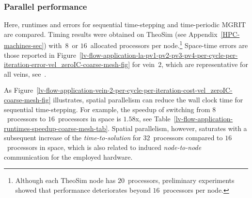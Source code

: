 \documentclass[3p]{elsarticle}
\begin{document}
\subsubsection{Parallel performance}
Here, runtimes and errors for sequential time-stepping and time-periodic MGRIT are compared.
Timing results were obtained on TheoSim (see Appendix~\ref{HPC-machines-sec})
with~$8$~or $16$~allocated processors per node.\footnote{Although each TheoSim node has $20$~processors,
preliminary experiments showed that performance deteriorates beyond $16$~processors per node.}
Space-time errors are those reported
in Figure~\ref{lv-flow-application-la-pv1-pv2-pv3-pv4-per-cycle-per-iteration-error-vel_zeroIC-coarse-mesh-fig}
for vein~$2$, which are representative for all veins, see~\cite{Hessenthaler2020_PhD}.

As Figure~\ref{lv-flow-application-vein-2-per-cycle-per-iteration-cost-vel_zeroIC-coarse-mesh-fig} illustrates,
spatial parallelism can reduce the wall clock time for sequential time-stepping.
For example, the speedup of switching from $8$~processors to $16$~processors in space
is $1.58$x, see Table~\ref{lv-flow-application-runtimes-speedup-coarse-mesh-tab}.
Spatial parallelism, however, saturates with a subsequent increase of the \emph{time-to-solution}
for $32$~processors compared to $16$~processors in space, which is also related
to induced \emph{node-to-node} communication for the employed hardware.
\end{document}
